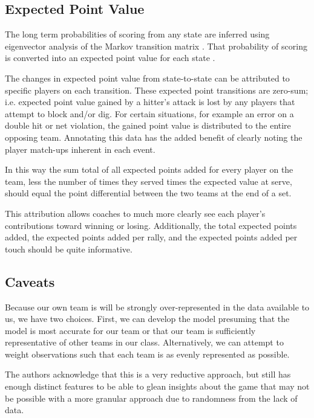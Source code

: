 \documentclass{IOS-Book-Article}
\begin{document}
\subsection{Expected Point Value}

The long term probabilities of scoring from any state are inferred using eigenvector analysis of the
Markov transition matrix \cite{mit}. That probability of scoring is converted into an expected point
value for each state \cite{gordonprobwin}.

The changes in expected point value from state-to-state can be attributed to specific players on 
each transition.  These expected point transitions are zero-sum; i.e. expected point value gained by
a hitter's attack is lost by any players that attempt to block and/or dig. For certain situations, 
for example an error on a double hit or net violation, the gained point value is distributed to the 
entire opposing team. Annotating this data has the added benefit of clearly noting the player 
match-ups inherent in each event.

In this way the sum total of all expected points added for every player on the team, less the number
of times they served times the expected value at serve, should equal the point differential between
the two teams at the end of a set.

This attribution allows coaches to much more clearly see each player's contributions toward winning 
or losing.  Additionally, the total expected points added, the expected points added per rally, and 
the expected points added per touch should be quite informative.

\subsection{Caveats}

Because our own team is will be strongly over-represented in the data available to us, we have two
choices. First, we can develop the model presuming that the model is most accurate for our team or 
that our team is sufficiently representative of other teams in our class.  Alternatively, we can 
attempt to weight observations such that each team is as evenly represented as possible.

The authors acknowledge that this is a very reductive approach, but still has enough distinct
features to be able to glean insights about the game that may not be possible with a more granular
approach due to randomness from the lack of data.
\end{document}
